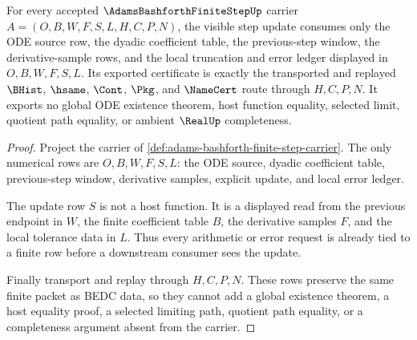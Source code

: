 \begin{theorem}
\label{thm:adams-bashforth-finite-step-error-ledger}
For every accepted $\AdamsBashforthFiniteStepUp$ carrier $A=(O,B,W,F,S,L,H,C,P,N)$, the visible step update consumes only the ODE source row, the dyadic coefficient table, the previous-step window, the derivative-sample rows, and the local truncation and error ledger displayed in $O,B,W,F,S,L$. Its exported certificate is exactly the transported and replayed $\BHist$, $\hsame$, $\Cont$, $\Pkg$, and $\NameCert$ route through $H,C,P,N$. It exports no global ODE existence theorem, host function equality, selected limit, quotient path equality, or ambient $\RealUp$ completeness.
\end{theorem}
\begin{proof}
Project the carrier of \autoref{def:adams-bashforth-finite-step-carrier}. The only numerical rows are $O,B,W,F,S,L$: the ODE source, dyadic coefficient table, previous-step window, derivative samples, explicit update, and local error ledger.

The update row $S$ is not a host function. It is a displayed read from the previous endpoint in $W$, the finite coefficient table $B$, the derivative samples $F$, and the local tolerance data in $L$. Thus every arithmetic or error request is already tied to a finite row before a downstream consumer sees the update.

Finally transport and replay through $H,C,P,N$. These rows preserve the same finite packet as BEDC data, so they cannot add a global existence theorem, a host equality proof, a selected limiting path, quotient path equality, or a completeness argument absent from the carrier.
\end{proof}


\begin{closurestatus}{\AdamsBashforthFiniteStepUp}
  \theoryclosure{\seedClosure}
  \formalstatus{\unformalizedV}
\end{closurestatus}
